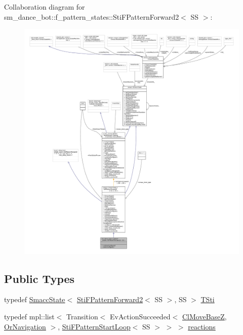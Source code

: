 Collaboration diagram for sm\+\_\+dance\+\_\+bot\+:\+:f\+\_\+pattern\+\_\+states\+:\+:Sti\+F\+Pattern\+Forward2$<$ SS $>$\+:
\nopagebreak
\begin{figure}[H]
\begin{center}
\leavevmode
\includegraphics[width=350pt]{structsm__dance__bot_1_1f__pattern__states_1_1StiFPatternForward2__coll__graph}
\end{center}
\end{figure}
\subsection*{Public Types}
\begin{DoxyCompactItemize}
\item 
typedef \hyperlink{classSmaccState}{Smacc\+State}$<$ \hyperlink{structsm__dance__bot_1_1f__pattern__states_1_1StiFPatternForward2}{Sti\+F\+Pattern\+Forward2}$<$ SS $>$, SS $>$ \hyperlink{structsm__dance__bot_1_1f__pattern__states_1_1StiFPatternForward2_a9579984c93060baa23d437238b0b2f9e}{T\+Sti}
\item 
typedef mpl\+::list$<$ Transition$<$ Ev\+Action\+Succeeded$<$ \hyperlink{classmove__base__z__client_1_1ClMoveBaseZ}{Cl\+Move\+BaseZ}, \hyperlink{classsm__dance__bot_1_1OrNavigation}{Or\+Navigation} $>$, \hyperlink{structsm__dance__bot_1_1f__pattern__states_1_1StiFPatternStartLoop}{Sti\+F\+Pattern\+Start\+Loop}$<$ SS $>$ $>$ $>$ \hyperlink{structsm__dance__bot_1_1f__pattern__states_1_1StiFPatternForward2_a16524d739d8b056a6b53bd9122a3f070}{reactions}
\end{DoxyCompactItemize}
